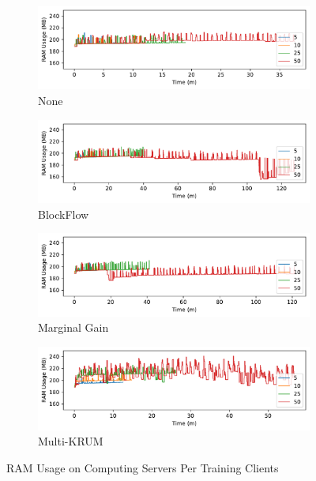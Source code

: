\begin{figure}[!ht]
    \centering
    \begin{subfigure}[b]{0.49\textwidth}
        \centering
        \includegraphics[width=\textwidth]{graphics/clients/ram_none_server.pdf}
        \caption{None}
    \end{subfigure}
    \hfill
    \begin{subfigure}[b]{0.49\textwidth}
        \centering
        \includegraphics[width=\textwidth]{graphics/clients/ram_blockflow_server.pdf}
        \caption{BlockFlow}
    \end{subfigure}
    \hfill
    \begin{subfigure}[b]{0.49\textwidth}
        \centering
        \includegraphics[width=\textwidth]{graphics/clients/ram_marginalgain_server.pdf}
        \caption{Marginal Gain}
    \end{subfigure}
    \hfill
    \begin{subfigure}[b]{0.49\textwidth}
        \centering
        \includegraphics[width=\textwidth]{graphics/clients/ram_multikrum_server.pdf}
        \caption{Multi-KRUM}
    \end{subfigure}
    \caption{RAM Usage on Computing Servers Per Training Clients}
    \label{fig:ram_clients_degree_server}
\end{figure}

